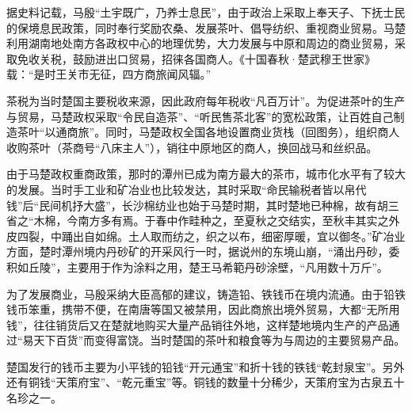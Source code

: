 据史料记载，马殷“土宇既广，乃养士息民”，由于政治上采取上奉天子、下抚士民的保境息民政策，同时奉行奖励农桑、发展茶叶、倡导纺织、重视商业贸易。马楚利用湖南地处南方各政权中心的地理优势，大力发展与中原和周边的商业贸易，采取免收关税，鼓励进出口贸易，招徕各国商人。《十国春秋·楚武穆王世家》载：“是时王关市无征，四方商旅闻风辐。”

茶税为当时楚国主要税收来源，因此政府每年税收“凡百万计”。为促进茶叶的生产与贸易，马楚政权采取“令民自造茶”、“听民售茶北客”的宽松政策，让百姓自己制造茶叶“以通商旅”。同时，马楚政权全国各地设置商业货栈（回图务），组织商人收购茶叶（茶商号“八床主人”），销往中原地区的商人，换回战马和丝织品。

由于马楚政权重商政策，那时的潭州已成为南方最大的茶市，城市化水平有了较大的发展。当时手工业和矿冶业也比较发达，其时采取“命民输税者皆以帛代钱”后“民间机抒大盛”，长沙棉纺业也始于马楚时期，其时楚地已种棉，故有胡三省之“木棉，今南方多有焉。于春中作畦种之，至夏秋之交结实，至秋丰其实之外皮四裂，中踊出自如绵。土人取而纺之，织之以布，细密厚暖，宜以御冬。”矿冶业方面，楚时潭州境内丹砂矿的开采风行一时，据说州的东境山崩，“涌出丹砂，委积如丘陵”，主要用于作为涂料之用，楚王马希範丹砂涂壁，“凡用数十万斤”。

为了发展商业，马殷采纳大臣高郁的建议，铸造铅、铁钱币在境内流通。由于铅铁钱币笨重，携带不便，在南唐等国又被禁用，因此商旅出境外贸易，大都“无所用钱”，往往销货后又在楚就地购买大量产品销往外地，这样楚地境内生产的产品通过“易天下百货”而变得富饶。当时楚国的茶叶和粮食等为与周边的主要贸易产品。

楚国发行的钱币主要为小平钱的铅钱“开元通宝”和折十钱的铁钱“乾封泉宝”。另外还有铜钱“天策府宝”、“乾元重宝”等。铜钱的数量十分稀少，天策府宝为古泉五十名珍之一。









